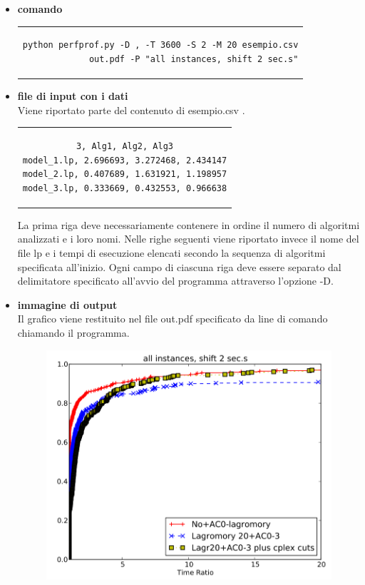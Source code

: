 \begin{itemize}
\item{\textbf{comando}
\begin{center}
\begin{tabular}{c}
\begin{lstlisting}[linewidth=330pt, basicstyle=\footnotesize\sffamily,] 
python perfprof.py -D , -T 3600 -S 2 -M 20 esempio.csv
             out.pdf -P "all instances, shift 2 sec.s"
\end{lstlisting}
\end{tabular}
\end{center}
}
\item{\textbf{file di input con i dati}\\
Viene riportato parte del contenuto di esempio.csv .
\begin{center}
\begin{tabular}{c}
\begin{lstlisting}[linewidth=240pt, basicstyle=\footnotesize\sffamily,] 
3, Alg1, Alg2, Alg3
model_1.lp, 2.696693, 3.272468, 2.434147
model_2.lp, 0.407689, 1.631921, 1.198957
model_3.lp, 0.333669, 0.432553, 0.966638
\end{lstlisting}
\end{tabular}
\end{center}
La prima riga deve necessariamente contenere in ordine il numero di algoritmi analizzati e i loro nomi. Nelle righe seguenti viene riportato invece il nome del file lp e i tempi di esecuzione elencati secondo la sequenza di algoritmi specificata all'inizio.
Ogni campo di ciascuna riga deve essere separato dal delimitatore specificato all'avvio del programma attraverso l'opzione -D.
}
\item{\textbf{immagine di output}\\
Il grafico viene restituito nel file out.pdf specificato da line di comando chiamando il programma.
\begin{figure}[h] 
\begin{center} 
  \includegraphics[scale=0.6]{Images/profile_out}\\ 
\end{center} 
\end{figure}
}
\end{itemize}
